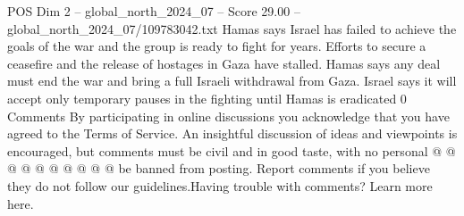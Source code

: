 \begin{textsample}{POS Dim 2 – global\_north\_2024\_07 – Score 29.00 – global\_north\_2024\_07/109783042.txt}
Hamas says Israel has failed to achieve the goals of the war and the group is ready to fight for years.
Efforts to secure a ceasefire and the release of hostages in Gaza have stalled.
Hamas says any deal must end the war and bring a full Israeli withdrawal from Gaza.
Israel says it will accept only temporary pauses in the fighting until Hamas is eradicated 0 Comments By participating in online discussions you acknowledge that you have agreed to the Terms of Service.
An insightful discussion of ideas and viewpoints is encouraged, but comments must be civil and in good taste, with no personal @ @ @ @ @ @ @ @ @ @ be banned from posting.
Report comments if you believe they do not follow our guidelines.Having trouble with comments?
Learn more here.

\end{textsample}
